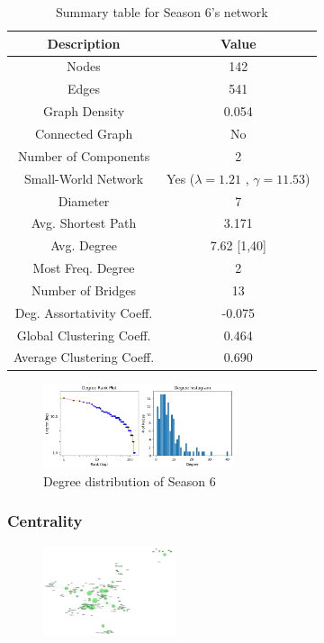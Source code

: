 \documentclass[10pt,twocolumn,letterpaper]{article}
\begin{document}
\begin{table}[!h]
    \centering
    \small
    \begin{tabular}{c|c}
        Description & Value  \\
        \hline
        Nodes & 142\\
        Edges & 541 \\
        Graph Density & 0.054 \\
        Connected Graph & No \\
        Number of Components & 2 \\
        Small-World Network & Yes ($\lambda=1.21$ , $\gamma=11.53$) \\
        Diameter & 7 \\
        Avg. Shortest Path & 3.171 \\
        Avg. Degree & 7.62 [1,40] \\
        Most Freq. Degree & 2 \\
        Number of Bridges & 13 \\
        Deg. Assortativity Coeff. & -0.075\\
        Global Clustering Coeff. & 0.464 \\
        Average Clustering Coeff. & 0.690 \\
        \hline 
    \end{tabular}
    \vspace{0.2cm}
    \caption{Summary table for Season 6's network}
    \label{tab:my_label}
\end{table} 

\begin{figure}[!h]
    \includegraphics[width=0.5\textwidth]{img/s6/degree_plot.jpg}
    \caption{\small{Degree distribution of Season 6}}
\end{figure}


\subsubsection{Centrality}


\begin{figure}[!h]
    \centering
    \includegraphics[width=0.35\textwidth]{img/s6/pagerank_graph.jpg}
\end{figure}
\end{document}
